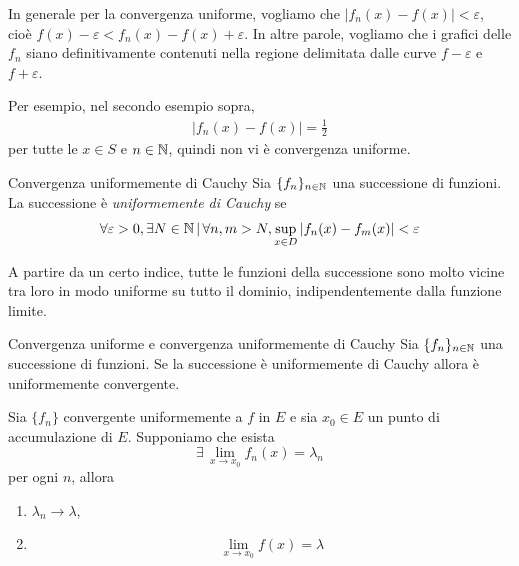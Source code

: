 \documentclass[a4paper]{article}
\begin{document}
\begin{radioactive}
In generale per la convergenza uniforme, vogliamo che \(|f_n(x) - f(x)| < \varepsilon\),
cioè \(f(x) - \varepsilon < f_n(x) - f(x) + \varepsilon\).
In altre parole, vogliamo che i grafici delle \(f_n\) siano definitivamente contenuti
nella regione delimitata dalle curve \(f-\varepsilon\) e \(f + \varepsilon\).
\end{radioactive}

Per esempio, nel secondo esempio sopra,
\begin{align*}
    |f_n(x) - f(x)| = \frac12
\end{align*}
per tutte le \(x \in S\) e \(n \in \mathbb{N}\), quindi non vi è convergenza uniforme.

\begin{radioactive}
\begin{snippetdefinition}{Convergenza uniformemente di Cauchy}
    Sia \(\{f_n\}_{n\in\mathbb{N}}\) una successione di funzioni.
    La successione è \emph{uniformemente di Cauchy} se
    \[
        \forall \varepsilon > 0,
        \exists N \in \mathbb{N} \,|\,
        \forall n,m > N,
        \sup_{x\in D} \left| f_n(x) - f_m(x) \right| < \varepsilon
    \]
\end{snippetdefinition}

A partire da un certo indice, tutte le funzioni della successione sono molto vicine tra loro in modo uniforme su tutto il dominio,
indipendentemente dalla funzione limite.
\end{radioactive}

\pagebreak

\begin{snippettheorem}{Convergenza uniforme e convergenza uniformemente di Cauchy}
    Sia \(\{f_n\}_{n\in\mathbb{N}}\) una successione di funzioni.
    Se la successione è uniformemente di Cauchy allora è uniformemente convergente.
\end{snippettheorem}

\begin{snippettheorem}{}
    Sia \(\{f_n\}\) convergente uniformemente a \(f\) in \(E\) e sia \(x_0\in E\) un punto di accumulazione di \(E\).
    Supponiamo che esista
    \[
        \exists\, \lim_{x\to x_0} f_n(x) = \lambda_n
    \]
    per ogni \(n\), allora
    \begin{enumerate}
        \item \(\lambda_n \to \lambda\),
        \item \[
            \lim_{x\to x_0} f(x) = \lambda
        \]
    \end{enumerate}
\end{snippettheorem}
\end{document}

